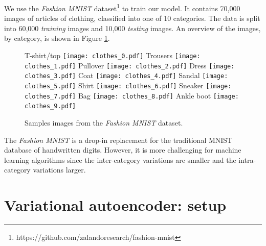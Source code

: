 \documentclass[]{article}
\begin{document}
\hspace{\parindent} We use the \textit{Fashion MNIST} dataset\footnote{https://github.com/zalandoresearch/fashion-mnist} to train our model. It contains 70,000 images of articles of clothing, classified into one of 10 categories. The data is split into 60,000 \textit{training} images and 10,000 \textit{testing} images. An overview of the images, by category, is shown in Figure \ref{fig:mnist_fashion}.

\begin{figure}
  \centering
  T-shirt/top
  \texttt{[image: clothes\_0.pdf]}
  Trousers
  \texttt{[image: clothes\_1.pdf]}
  Pullover
  \texttt{[image: clothes\_2.pdf]}
  Dress
  \texttt{[image: clothes\_3.pdf]}
  Coat
  \texttt{[image: clothes\_4.pdf]}
  Sandal
  \texttt{[image: clothes\_5.pdf]}
  Shirt
  \texttt{[image: clothes\_6.pdf]}
  Sneaker
  \texttt{[image: clothes\_7.pdf]}
  Bag
  \texttt{[image: clothes\_8.pdf]}
  Ankle boot
  \texttt{[image: clothes\_9.pdf]}
  \caption{Samples images from the \textit{Fashion MNIST} dataset.}
  \label{fig:mnist_fashion}
\end{figure}

The \textit{Fashion MNIST} is a drop-in replacement for the traditional MNIST database of handwritten digits. However, it is more challenging for machine learning algorithms since the inter-category variations are smaller and the intra-category variations larger. 




\section{Variational autoencoder: setup}
\label{sec:vae}
\end{document}

